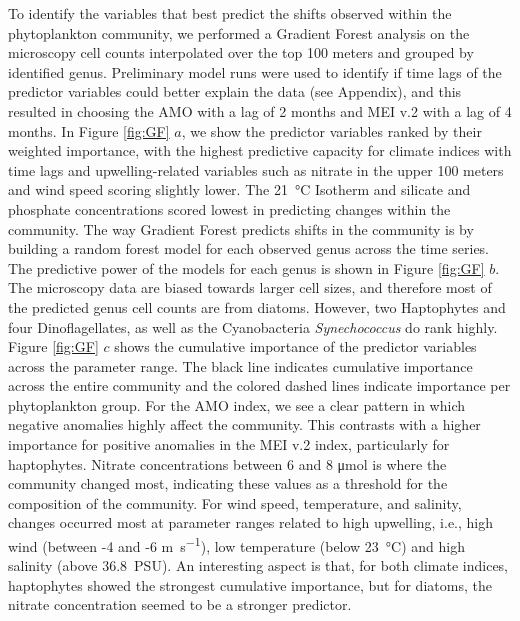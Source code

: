 \documentclass[draft]{agujournal2019}
\begin{document}
To identify the variables that best predict the shifts observed within the phytoplankton community, we performed a Gradient Forest analysis on the microscopy cell counts interpolated over the top 100 meters and grouped by identified genus. Preliminary model runs were used to identify if time lags of the predictor variables could better explain the data (see Appendix), and this resulted in choosing the AMO with a lag of 2 months and MEI v.2 with a lag of 4 months. In Figure \ref{fig:GF} $a$, we show the predictor variables ranked by their weighted importance, with the highest predictive capacity for climate indices with time lags and upwelling-related variables such as nitrate in the upper 100 meters and wind speed scoring slightly lower. The \qty{21}{\celsius} Isotherm and silicate and phosphate concentrations scored lowest in predicting changes within the community. The way Gradient Forest predicts shifts in the community is by building a random forest model for each observed genus across the time series. The predictive power of the models for each genus is shown in Figure \ref{fig:GF} $b$. The microscopy data are biased towards larger cell sizes, and therefore most of the predicted genus cell counts are from diatoms. However, two Haptophytes and four Dinoflagellates, as well as the Cyanobacteria \textit{Synechococcus} do rank highly.
Figure \ref{fig:GF} $c$ shows the cumulative importance of the predictor variables across the parameter range. The black line indicates cumulative importance across the entire community and the colored dashed lines indicate importance per phytoplankton group. For the AMO index, we see a clear pattern in which negative anomalies highly affect the community. This contrasts with a higher importance for positive anomalies in the MEI v.2 index, particularly for haptophytes. Nitrate concentrations between 6 and 8 \unit{\micro \mole} is where the community changed most, indicating these values as a threshold for the composition of the community. For wind speed, temperature, and salinity, changes occurred most at parameter ranges related to high upwelling, i.e., high wind (between -4 and -6 \unit{m.s^{-1}}), low temperature (below \qty{23}{\celsius}) and high salinity (above \qty{36.8}{PSU}). An interesting aspect is that, for both climate indices, haptophytes showed the strongest cumulative importance, but for diatoms, the nitrate concentration seemed to be a stronger predictor. 
\end{document}
